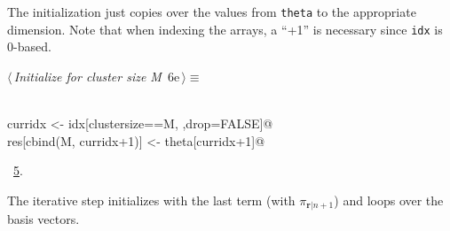 \documentclass[reqno]{amsart}
\renewcommand{\NWtarget}[2]{\hypertarget{#1}{#2}}
\renewcommand{\NWlink}[2]{\hyperlink{#1}{#2}}
\newcommand{\rvec}{\mathbf{r}}
\begin{document}
The initialization just copies over the values from \texttt{theta} to the appropriate dimension. Note that when indexing
the arrays, a ``+1'' is necessary since \texttt{idx} is 0-based.
\begin{flushleft} \small
\begin{minipage}{\linewidth}\label{scrap25}\raggedright\small
\NWtarget{nuweb6e}{} $\langle\,${\itshape Initialize for cluster size M}\nobreak\ {\footnotesize {6e}}$\,\rangle\equiv$
\vspace{-1ex}
\begin{list}{}{} \item
\mbox{}\verb@@\\
\mbox{}\verb@  curridx <- idx[clustersize==M, ,drop=FALSE]@\\
\mbox{}\verb@  res[cbind(M, curridx+1)] <- theta[curridx+1]@\\
\mbox{}\verb@@{\NWsep}
\end{list}
\vspace{-1.5ex}
\footnotesize
\begin{list}{}{\setlength{\itemsep}{-\parsep}\setlength{\itemindent}{-\leftmargin}}
\item \NWtxtMacroRefIn\ \NWlink{nuweb5}{5}.

\item{}
\end{list}
\end{minipage}\vspace{4ex}
\end{flushleft}
The iterative step initializes with the last term (with $\pi_{\rvec|n+1}$) and loops over the basis vectors.
\end{document}
